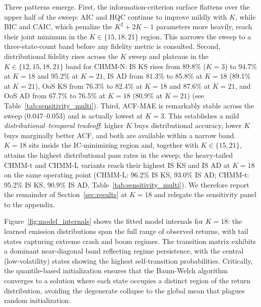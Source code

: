 Three patterns emerge.
First, the information-criterion surface flattens over the upper half of the sweep: AIC and HQC continue to improve mildly with $K$, while BIC and CAIC, which penalize the $K^2 + 2K - 1$ parameters more heavily, reach their joint minimum in the $K \in \{15, 18, 21\}$ region.
This narrows the sweep to a three-state-count band before any fidelity metric is consulted.
Second, distributional fidelity rises across the $K$ sweep and plateaus in the $K \in \{12, 15, 18, 21\}$ band for CHMM-N: IS KS rises from 89.8\% ($K = 3$) to 94.7\% at $K = 18$ and 95.2\% at $K = 21$, IS AD from 81.3\% to 85.8\% at $K = 18$ (89.1\% at $K = 21$), OoS KS from 76.3\% to 82.4\% at $K = 18$ and 87.6\% at $K = 21$, and OoS AD from 67.7\% to 76.5\% at $K = 18$ (80.9\% at $K = 21$) (see Table~\ref{tab:sensitivity_multi}).
Third, ACF-MAE is remarkably stable across the sweep (0.047--0.053) and is actually lowest at $K = 3$.
This establishes a mild \emph{distributional--temporal tradeoff}: higher $K$ buys distributional accuracy, lower $K$ buys marginally better ACF, and both are available within a narrow band.
$K = 18$ sits inside the IC-minimizing region and, together with $K \in \{15, 21\}$, attains the highest distributional pass rates in the sweep; the heavy-tailed CHMM-t and CHMM-L variants reach their highest IS KS and IS AD at $K = 18$ on the same operating point (CHMM-L: 96.2\% IS KS, 93.0\% IS AD; CHMM-t: 95.2\% IS KS, 90.9\% IS AD, Table~\ref{tab:sensitivity_multi}).
We therefore report the remainder of Section~\ref{sec:results} at $K = 18$ and relegate the sensitivity panel to the appendix.

Figure~\ref{fig:model_internals} shows the fitted model internals for $K = 18$: the learned emission distributions span the full range of observed returns, with tail states capturing extreme crash and boom regimes.
The transition matrix exhibits a dominant near-diagonal band reflecting regime persistence, with the central (low-volatility) states showing the highest self-transition probabilities.
Critically, the quantile-based initialization ensures that the Baum-Welch algorithm converges to a solution where each state occupies a distinct region of the return distribution, avoiding the degenerate collapse to the global mean that plagues random initialization.


